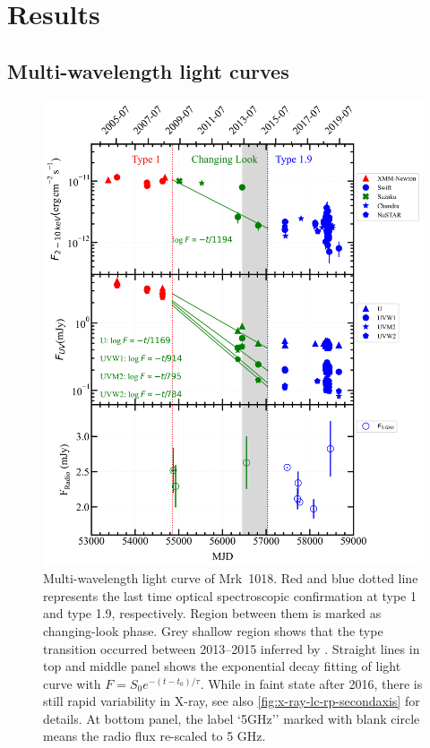 \documentclass[twocolumn]{aastex63}
\begin{document}
\section{Results}
\label{sec:result}

\subsection{Multi-wavelength light curves}
\label{sec:multi-lc}

\begin{figure}
\centering
	\includegraphics[width=\textwidth]{./pic/subplots-xrt_uvot-radio-second.png}
    \caption{Multi-wavelength light curve of Mrk~1018. Red and blue dotted line represents the last time optical spectroscopic confirmation at type 1 and type 1.9, respectively. Region between them is marked as changing-look phase. Grey shallow region shows that the type transition occurred between 2013--2015 inferred by \citet{2017A&A...607L...9K}. Straight lines in top and middle panel shows the exponential decay fitting of light curve with $F=S_0 e^{-(t-t_0)/\tau }$.  While in faint state after 2016, there is still rapid variability in X-ray, see also \autoref{fig:x-ray-lc-rp-secondaxis} for details. At bottom panel, the label `5GHz'' marked with blank circle means the radio flux re-scaled to 5 GHz.}
    \label{fig:multi-lc-secondaxis}
\end{figure}
\end{document}
